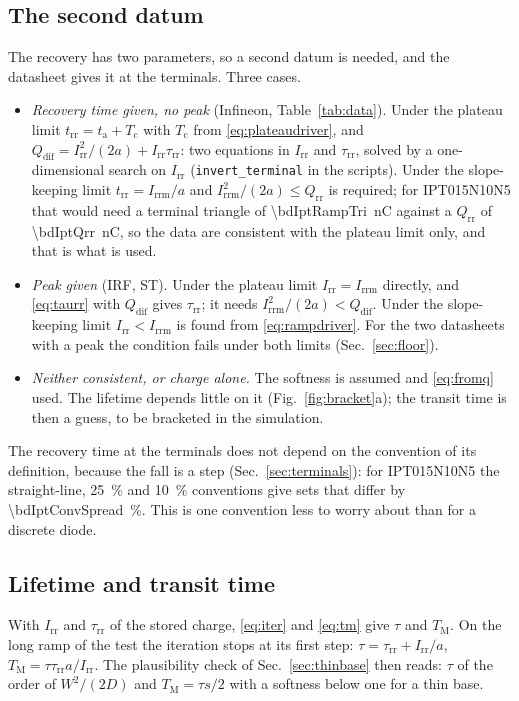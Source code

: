 \documentclass[10pt,a4paper]{scrartcl}
\newcommand{\Irr}{I_\mathrm{rr}}
\newcommand{\Irrm}{I_\mathrm{rrm}}
\newcommand{\Qrr}{Q_\mathrm{rr}}
\newcommand{\Qdif}{Q_\mathrm{dif}}
\newcommand{\trr}{t_\mathrm{rr}}
\newcommand{\ta}{t_\mathrm{a}}
\newcommand{\Tc}{T_\mathrm{c}}
\newcommand{\taurr}{\tau_\mathrm{rr}}
\newcommand{\TM}{T_\mathrm{M}}
\newcommand{\IPT}{IPT015N10N5}
\begin{document}
\subsection{The second datum}
\label{sec:second}
The recovery has two parameters, so a second datum is needed, and the datasheet gives it at the terminals. Three cases.
\begin{itemize}
\item \emph{Recovery time given, no peak} (Infineon, Table~\ref{tab:data}). Under the plateau limit $\trr = \ta + \Tc$ with $\Tc$ from \eqref{eq:plateaudriver}, and $\Qdif = \Irr^2/(2a) + \Irr\taurr$: two equations in $\Irr$ and $\taurr$, solved by a one-dimensional search on $\Irr$ (\texttt{invert\_terminal} in the scripts). Under the slope-keeping limit $\trr = \Irrm/a$ and $\Irrm^2/(2a) \leq \Qrr$ is required; for \IPT{} that would need a terminal triangle of \SI{\bdIptRampTri}{\nano\coulomb} against a $\Qrr$ of \SI{\bdIptQrr}{\nano\coulomb}, so the data are consistent with the plateau limit only, and that is what is used.
\item \emph{Peak given} (IRF, ST). Under the plateau limit $\Irr = \Irrm$ directly, and \eqref{eq:taurr} with $\Qdif$ gives $\taurr$; it needs $\Irrm^2/(2a) < \Qdif$. Under the slope-keeping limit $\Irr < \Irrm$ is found from \eqref{eq:rampdriver}. For the two datasheets with a peak the condition fails under both limits (Sec.~\ref{sec:floor}).
\item \emph{Neither consistent, or charge alone.} The softness is assumed and \eqref{eq:fromq} used. The lifetime depends little on it (Fig.~\ref{fig:bracket}a); the transit time is then a guess, to be bracketed in the simulation.
\end{itemize}
The recovery time at the terminals does not depend on the convention of its definition, because the fall is a step (Sec.~\ref{sec:terminals}): for \IPT{} the straight-line, \SI{25}{\percent} and \SI{10}{\percent} conventions give sets that differ by \SI{\bdIptConvSpread}{\percent}. This is one convention less to worry about than for a discrete diode.

\subsection{Lifetime and transit time}
With $\Irr$ and $\taurr$ of the stored charge, \eqref{eq:iter} and \eqref{eq:tm} give $\tau$ and $\TM$. On the long ramp of the test the iteration stops at its first step: $\tau = \taurr + \Irr/a$, $\TM = \tau\taurr a/\Irr$. The plausibility check of Sec.~\ref{sec:thinbase} then reads: $\tau$ of the order of $W^2/(2D)$ and $\TM = \tau s/2$ with a softness below one for a thin base.
\end{document}
